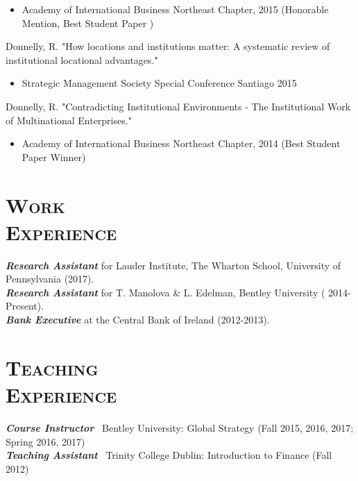 \documentclass[margin, 12pt]{res}
\begin{document}
\begin{resume}
\begin{itemize}
\item Academy of International Business Northeast Chapter, 2015 (Honorable Mention, Best Student Paper )
\end{itemize}



\vspace{-0.25cm}
Donnelly, R.  "How locations and institutions matter: A systematic review of institutional locational advantages." 
\begin{itemize}
\item Strategic Management Society Special Conference Santiago 2015
\end{itemize}
\vspace{-0.25cm}
Donnelly, R.  "Contradicting Institutional Environments - The Institutional Work of Multinational Enterprises."
\begin{itemize}
\item Academy of International Business Northeast Chapter, 2014  (Best Student Paper Winner)

\end{itemize}



\section{\normalfont\textsc{Work \\Experience}}
\textbf{\textit{Research Assistant}} for Lauder Institute, The Wharton School, University of Pennsylvania (2017). \\
\textbf{\textit{Research Assistant}} for T. Manolova \& L. Edelman, Bentley University ( 2014-Present). \\
\textbf{\textit{Bank Executive}} at the Central Bank of Ireland (2012-2013). 


\section{\normalfont\textsc{Teaching \\Experience}}
\textbf{\textit{Course Instructor}}~ Bentley University:
Global Strategy (Fall 2015, 2016, 2017; Spring 2016, 2017) \\
\textbf{\textit{Teaching Assistant}}~ Trinity College Dublin:
Introduction to Finance (Fall 2012)
 

\end{resume}
\end{document}
